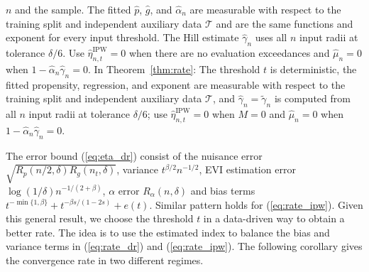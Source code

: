 \documentclass[12pt]{article}
\theoremstyle{plain}
\theoremstyle{definition}
\begin{document}
$n$ and the sample. The fitted $\hat p$, $\hat g$, and $\hat\alpha_n$ are measurable with respect to the training split and independent auxiliary data $\mathcal T$ and are the same functions and exponent for every input threshold. The Hill estimate $\hat\gamma_n$ uses all $n$ input radii at tolerance $\delta/6$. Use $\hat\eta_{n,t}^{\mathrm{IPW}}=0$ when there are no evaluation exceedances and $\hat\mu_n=0$ when $1-\hat\alpha_n\hat\gamma_n=0$. In Theorem~\ref{thm:rate}: The threshold $t$ is deterministic, the fitted propensity, regression, and exponent are measurable with respect to the training split and independent auxiliary data $\mathcal T$, and $\hat\gamma_n=\widetilde\gamma_n$ is computed from all $n$ input radii at tolerance $\delta/6$; use $\hat\eta_{n,t}^{\mathrm{IPW}}=0$ when $M=0$ and $\hat\mu_n=0$ when $1-\hat\alpha_n\hat\gamma_n=0$.


The error bound (\ref{eq:eta_dr}) consist of the nuisance error $ \sqrt{R_p (n/2, \delta)R_g ({n_t}, \delta)}$, variance $ t^{\beta / 2} n^{-1 / 2} $, EVI estimation error $ \log (1 / \delta) n^{- 1 / (2 +\beta)} $, $\alpha$ error $ R_\alpha (n,\delta)$ and bias terms $ t^{- \min \{1, \beta\}}  + t^{- \beta s / (1 - 2 s)} +  e (t) $. Similar pattern holds for (\ref{eq:rate_ipw}). Given this general result, we choose the threshold $t$ in a data-driven way to obtain a better rate. The idea is to use the estimated index to balance
the bias and variance terms in (\ref{eq:rate_dr}) and (\ref{eq:rate_ipw}). The following corollary gives
the convergence rate in two different regimes.
\end{document}
